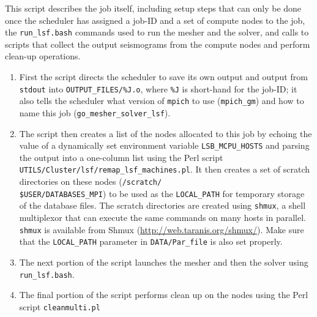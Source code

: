 \documentclass[oneside,english]{book}
\newcommand{\urlwithparentheses}[1]{(\url{#1})}
\begin{document}
This script describes the job itself, including setup steps that can
only be done once the scheduler has assigned a job-ID and a set of
compute nodes to the job, the \texttt{run\_lsf.bash} commands used
to run the mesher and the solver, and calls to scripts that collect
the output seismograms from the compute nodes and perform clean-up
operations.

\begin{enumerate}
\item First the script directs the scheduler to save its own output and
output from \texttt{stdout} into \texttt{\small OUTPUT\_FILES/\%J.o},
where \texttt{\%J} is short-hand for the job-ID; it also tells the
scheduler what version of \texttt{mpich} to use (\texttt{mpich\_gm})
and how to name this job (\texttt{go\_mesher\_solver\_lsf}).
\item The script then creates a list of the nodes allocated to this job
by echoing the value of a dynamically set environment variable \texttt{LSB\_MCPU\_HOSTS}
and parsing the output into a one-column list using the Perl script
\texttt{UTILS/Cluster/lsf/remap\_lsf\_machines.pl}. It then creates a set of scratch
directories on these nodes (\texttt{\small /scratch/}~\\
\texttt{\small \$USER/DATABASES\_MPI}) to be used as the \texttt{LOCAL\_PATH}
for temporary storage of the database files. The scratch directories
are created using \texttt{shmux}, a shell multiplexor that can execute
the same commands on many hosts in parallel. \texttt{shmux} is available
from Shmux \urlwithparentheses{http://web.taranis.org/shmux/}. Make sure that the \texttt{LOCAL\_PATH}
parameter in \texttt{DATA/Par\_file} is also set properly.
\item The next portion of the script launches the mesher and then the solver
using \texttt{run\_lsf.bash}.
\item The final portion of the script performs clean up on the nodes using
the Perl script \texttt{cleanmulti.pl}
\end{enumerate}
\end{document}
